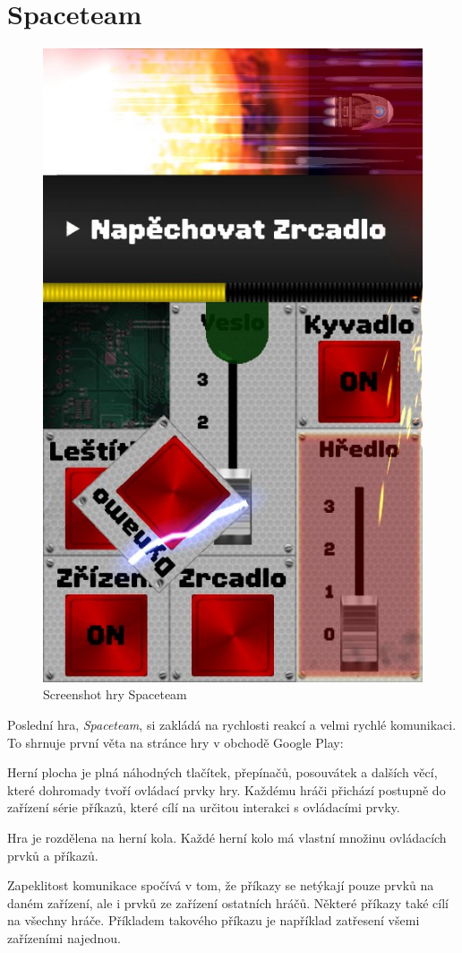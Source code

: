 \section{Spaceteam}

\begin{figure}
    \centering
    \includegraphics[width=0.5\linewidth]{assets/competitive-apps/spaceteam.jpg}
    \caption{Screenshot hry Spaceteam~\cite{henrysmithinc_spaceteam}}
    \label{fig:spaceteam}
\end{figure}

Poslední hra, \emph{Spaceteam}, si zakládá na rychlosti reakcí a velmi rychlé
komunikaci.
To shrnuje první věta na stránce hry v obchodě Google Play:
\emph{}
\cite{henrysmithinc_spaceteam}

Herní plocha je plná náhodných tlačítek, přepínačů, posouvátek a dalších věcí,
které dohromady tvoří ovládací prvky hry.
Každému hráči přichází postupně do zařízení série příkazů,
které cílí na určitou interakci s ovládacími prvky.

Hra je rozdělena na herní kola.
Každé herní kolo má vlastní množinu ovládacích prvků a příkazů.

Zapeklitost komunikace spočívá v tom,
že příkazy se netýkají pouze prvků na daném zařízení,
ale i prvků ze zařízení ostatních hráčů.
Některé příkazy také cílí na všechny hráče.
Příkladem takového příkazu je například zatřesení všemi zařízeními najednou.

